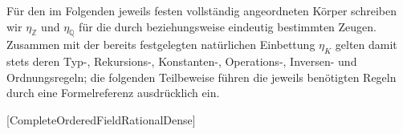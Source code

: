 \documentclass[main.tex]{subfiles}
\begin{document}
Für den im Folgenden jeweils festen vollständig angeordneten Körper schreiben
wir \(\eta_{\mathbb Z}\) und \(\eta_{\mathbb Q}\) für die durch
 beziehungsweise
 eindeutig
bestimmten Zeugen. Zusammen mit der bereits festgelegten natürlichen
Einbettung \(\eta_K\) gelten damit stets deren Typ-, Rekursions-, Konstanten-,
Operations-, Inversen- und Ordnungsregeln; die folgenden Teilbeweise führen
die jeweils benötigten Regeln durch eine Formelreferenz ausdrücklich ein.

\begin{tabproofsplitwide}
\setcounter{proofpartnr}{3}%

  [CompleteOrderedFieldRationalDense]
\end{tabproofsplitwide}
\end{document}
